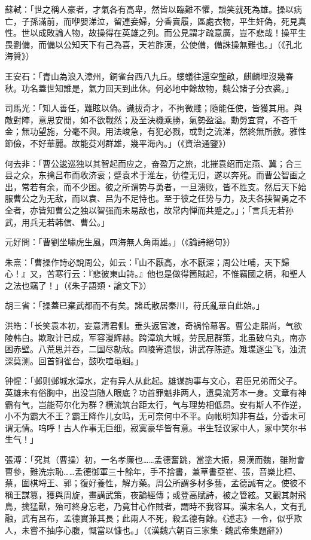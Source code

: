 蘇軾：「世之稱人豪者，才氣各有高卑，然皆以臨難不懼，談笑就死為雄。操以病亡，子孫滿前，而咿嬰涕泣，留連妾婦，分香賣履，區處衣物，平生奸偽，死見真性。世以成敗論人物，故操得在英雄之列。而公見謂才疏意廣，豈不悲哉！操平生畏劉備，而備以公知天下有己為喜，天若胙漢，公使備，備誅操無難也。」（《孔北海贊》）

王安石：「青山為浪入漳州，銅雀台西八九丘。螻蟻往還空壟畝，麒麟埋沒幾春秋。功名蓋世知誰是，氣力回天到此休。何必地中餘故物，魏公諸子分衣裘。」

司馬光：「知人善任，難眩以偽。識拔奇才，不拘微賤；隨能任使，皆獲其用。與敵對陣，意思安閒，如不欲戰然；及至決機乘勝，氣勢盈溢。勳勞宜賞，不吝千金；無功望施，分毫不與。用法峻急，有犯必戮，或對之流涕，然終無所赦。雅性節儉，不好華麗。故能芟刈群雄，幾平海內。」（《資治通鑒》）

何去非：「曹公逡巡独以其智起而应之，奋盈万之旅，北摧袁绍而定燕、冀；合三县之众，东擒吕布而收济衮；蹙袁术于淮左，彷徨无归，遂以奔死。而曹公智画之出，常若有余，而不少困。彼之所谓势与勇者，一旦溃败，皆不胜支。然后天下始服曹公之为无敌，而以袁、吕为不足恃也。至于彼之任势与力，及夫各挟智勇之不全者，亦皆知曹公之独以智强而未易敌也，故常内惮而共蹙之。」；「言兵无若孙武，用兵无若韩信、曹公。」

元好問：「曹劉坐嘯虎生風，四海無人角兩雄。」（《論詩絕句》）

朱熹：「曹操作詩必說周公，如云：『山不厭高，水不厭深；周公吐哺，天下歸心！』又，苦寒行云：『悲彼東山詩。』他也是做得箇賊起，不惟竊國之柄，和聖人之法也竊了！」（《朱子語類‧論文下》）

胡三省：「操蓋已棄武都而不有矣。諸氐散居秦川，苻氏亂華自此始。」

洪皓：「长笑袁本初，妄意清君侧。垂头返官渡，奇祸怜幕客。曹公走熙尚，气欲陵韩白。欺取计已成，军容漫辉赫。跨漳筑大城，劳民屈群策，北虽破乌丸，南亦困赤壁。八荒思并吞，二国尽勍敌。四陵寄遗恨，讲武存陈迹。雉堞逐尘飞，浊流深莫测。回首铜雀台，鼓吹喧黾蝈。」

钟惺：「邺则邺城水漳水，定有异人从此起。雄谋韵事与文心，君臣兄弟而父子。英雄未有俗胸中，出没岂随人眼底？功首罪魁非两人，遗臭流芳本一身。文章有神霸有气，岂能苟尔化为群？横流筑台距太行，气与理势相低昂。安有斯人不作逆，小不为霸大不王？霸王降作儿女鸣，无可奈何中不平。向帐明知非有益，分香未可谓无情。呜呼！古人作事无巨细，寂寞豪华皆有意。书生轻议冢中人，冢中笑尔书生气！」

張溥：「究其（曹操）初，一名孝廉也……孟德奮跳，當塗大振，易漢而魏，雖附會曹參，難洗宗恥……孟德御軍三十餘年，手不捨書，兼草書亞崔、張，音樂比桓、蔡，圍棋埒王、郭；復好養性，解方藥。周公所謂多材多藝，孟德誠有之。使彼不稱王謀篡，獲與周旋，畫講武策，夜論經傳；或登高賦詩，被之管絃。又觀其射飛鳥，擒猛獸，殆可終身忘老，乃竟甘心作賊者，謂時不我容耳。漢末名人，文有孔融，武有呂布，孟德實兼其長；此兩人不死，殺孟德有餘。《述志》一令，似乎欺人，未嘗不抽序心腹，慨當以慷也。」（《漢魏六朝百三家集·魏武帝集題辭》）

